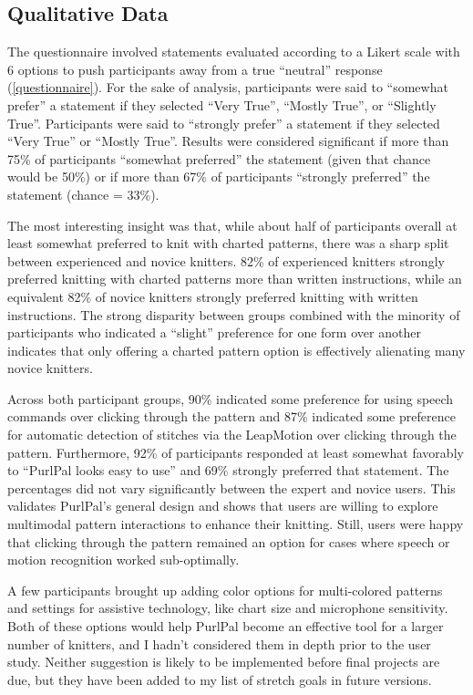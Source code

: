 \documentclass{article}
\begin{document}
\subsection{Qualitative Data}

The questionnaire involved statements evaluated according to a Likert scale with 6 options to push participants away from a true ``neutral'' response (\ref{questionnaire}).
For the sake of analysis, participants were said to ``somewhat prefer'' a statement if they selected ``Very True'', ``Mostly True'', or ``Slightly True''.
Participants were said to ``strongly prefer'' a statement if they selected ``Very True'' or ``Mostly True''.
Results were considered significant if more than 75\% of participants ``somewhat preferred'' the statement (given that chance would be 50\%) or if more than 67\% of participants ``strongly preferred'' the statement (chance = 33\%).

The most interesting insight was that, while about half of participants overall at least somewhat preferred to knit with charted patterns, there was a sharp split between experienced and novice knitters.
82\% of experienced knitters strongly preferred knitting with charted patterns more than written instructions, while an equivalent 82\% of novice knitters strongly preferred knitting with written instructions.
The strong disparity between groups combined with the minority of participants who indicated a ``slight'' preference for one form over another indicates that only offering a charted pattern option is effectively alienating many novice knitters.

Across both participant groups, 90\% indicated some preference for using speech commands over clicking through the pattern and 87\% indicated some preference for automatic detection of stitches via the LeapMotion over clicking through the pattern.
Furthermore, 92\% of participants responded at least somewhat favorably to ``PurlPal looks easy to use'' and 69\% strongly preferred that statement.
The percentages did not vary significantly between the expert and novice users.
This validates PurlPal's general design and shows that users are willing to explore multimodal pattern interactions to enhance their knitting.
Still, users were happy that clicking through the pattern remained an option for cases where speech or motion recognition worked sub-optimally.

A few participants brought up adding color options for multi-colored patterns and settings for assistive technology, like chart size and microphone sensitivity.
Both of these options would help PurlPal become an effective tool for a larger number of knitters, and I hadn't considered them in depth prior to the user study.
Neither suggestion is likely to be implemented before final projects are due, but they have been added to my list of stretch goals in future versions.
\end{document}
